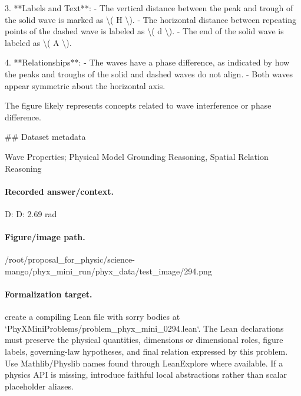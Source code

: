 3. **Labels and Text**:
   - The vertical distance between the peak and trough of the solid wave is marked as \textbackslash{}( H \textbackslash{}).
   - The horizontal distance between repeating points of the dashed wave is labeled as \textbackslash{}( d \textbackslash{}).
   - The end of the solid wave is labeled as \textbackslash{}( A \textbackslash{}).

4. **Relationships**:
   - The waves have a phase difference, as indicated by how the peaks and troughs of the solid and dashed waves do not align.
   - Both waves appear symmetric about the horizontal axis.

The figure likely represents concepts related to wave interference or phase difference.

\#\# Dataset metadata

Wave Properties; Physical Model Grounding Reasoning, Spatial Relation Reasoning

\paragraph{Recorded answer/context.}
D: D: 2.69 rad

\paragraph{Figure/image path.}
/root/proposal\_for\_physic/science-mango/phyx\_mini\_run/phyx\_data/test\_image/294.png

\paragraph{Formalization target.}
create a compiling Lean file with sorry bodies at `PhyXMiniProblems/problem\_phyx\_mini\_0294.lean`. The Lean declarations must preserve the physical quantities, dimensions or dimensional roles, figure labels, governing-law hypotheses, and final relation expressed by this problem.
Use Mathlib/Physlib names found through LeanExplore where available. If a physics API is missing, introduce faithful local abstractions rather than scalar placeholder aliases.

